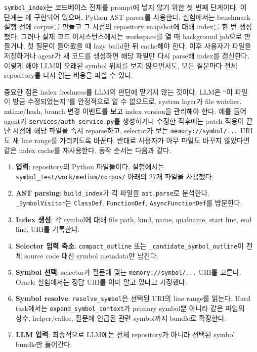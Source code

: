 \documentclass[11pt,a4paper]{article}
\newcommand{\codepath}[1]{\path{#1}}
\begin{document}
\texttt{symbol\_index}는 코드베이스 전체를 prompt에 넣지 않기 위한 첫 번째 단계이다. 이 단계는 \codepath{symbol_test/symbol_bench/indexer.py}에 구현되어 있으며, Python AST parser를 사용한다. 실험에서는 benchmark 실행 전에 corpus를 만들고 그 시점의 repository snapshot에 대해 index를 한 번 생성했다. 그러나 실제 코드 어시스턴스에서는 workspace를 열 때 background job으로 만들거나, 첫 질문이 들어왔을 때 lazy build한 뒤 cache해야 한다. 이후 사용자가 파일을 저장하거나 agent가 새 코드를 생성하면 해당 파일만 다시 parse해 index를 갱신한다. 이렇게 해야 LLM이 오래된 symbol 위치를 보지 않으면서도, 모든 질문마다 전체 repository를 다시 읽는 비용을 피할 수 있다.

중요한 점은 index freshness를 LLM의 판단에 맡기지 않는 것이다. LLM은 ``이 파일이 방금 수정되었는지''를 안정적으로 알 수 없으므로, system layer가 file watcher, mtime/hash, branch 변경 이벤트를 보고 index version을 관리해야 한다. 예를 들어 agent가 \texttt{services/auth\_service.py}를 생성하거나 수정한 직후에는 patch 적용이 끝난 시점에 해당 파일을 즉시 reparse하고, selector가 보는 \texttt{memory://symbol/...} URI도 새 line range를 가리키도록 바꾼다. 반대로 사용자가 아무 파일도 바꾸지 않았다면 같은 index cache를 재사용한다. 동작 순서는 다음과 같다.

\begin{enumerate}
  \item \textbf{입력}: repository의 Python 파일들이다. 실험에서는 \texttt{symbol\_test/work/medium/corpus/} 아래의 27개 파일을 사용했다.
  \item \textbf{AST parsing}: \texttt{build\_index}가 각 파일을 \texttt{ast.parse}로 분석한다. \texttt{\_SymbolVisitor}는 \texttt{ClassDef}, \texttt{FunctionDef}, \texttt{AsyncFunctionDef}를 방문한다.
  \item \textbf{Index 생성}: 각 symbol에 대해 file path, kind, name, qualname, start line, end line, URI를 기록한다.
  \item \textbf{Selector 입력 축소}: \texttt{compact\_outline} 또는 \texttt{\_candidate\_symbol\_outline}이 전체 source code 대신 symbol metadata만 남긴다.
  \item \textbf{Symbol 선택}: selector가 질문에 맞는 \texttt{memory://symbol/...} URI를 고른다. Oracle 실험에서는 정답 URI를 이미 알고 있다고 가정했다.
  \item \textbf{Symbol resolve}: \texttt{resolve\_symbol}은 선택된 URI의 line range를 읽는다. Hard task에서는 \texttt{expand\_symbol\_context}가 primary symbol뿐 아니라 같은 파일의 상수, helper/callee, 질문에 언급된 관련 symbol까지 bundle로 확장한다.
  \item \textbf{LLM 입력}: 최종적으로 LLM에는 전체 repository가 아니라 선택된 symbol bundle만 들어간다.
\end{enumerate}
\end{document}
